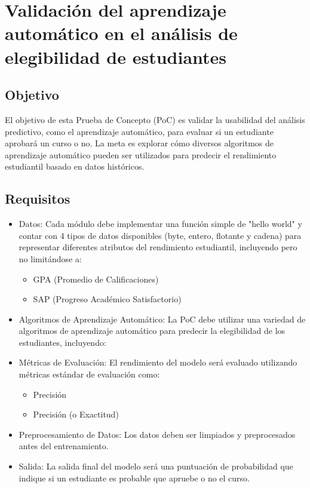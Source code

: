 \section{Validación del aprendizaje automático en el análisis de elegibilidad de estudiantes}

\subsection*{Objetivo}
El objetivo de esta Prueba de Concepto (PoC) es validar la usabilidad del análisis predictivo, como el aprendizaje automático, para evaluar si un estudiante aprobará un curso o no.
La meta es explorar cómo diversos algoritmos de aprendizaje automático pueden ser utilizados para predecir el rendimiento estudiantil basado en datos históricos.

\subsection*{Requisitos}
\begin{itemize}
    \item Datos: Cada módulo debe implementar una función simple de "hello world" y contar con 4 tipos de datos disponibles (byte, entero, flotante y cadena) para representar diferentes atributos del rendimiento estudiantil, incluyendo pero no limitándose a:
    \begin{itemize}
        \item GPA (Promedio de Calificaciones)
        \item SAP (Progreso Académico Satisfactorio)
    \end{itemize}
    \item Algoritmos de Aprendizaje Automático: La PoC debe utilizar una variedad de algoritmos de aprendizaje automático para predecir la elegibilidad de los estudiantes, incluyendo:
    \item Métricas de Evaluación: El rendimiento del modelo será evaluado utilizando métricas estándar de evaluación como:
    \begin{itemize}
        \item Precisión
        \item Precisión (o Exactitud)
    \end{itemize}
    \item Preprocesamiento de Datos: Los datos deben ser limpiados y preprocesados antes del entrenamiento.
    \item Salida: La salida final del modelo será una puntuación de probabilidad que indique si un estudiante es probable que apruebe o no el curso.
\end{itemize}
